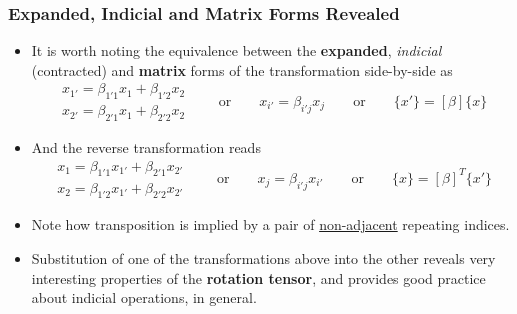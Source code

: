 \documentclass[11pt]{article}
\begin{document}
\subsubsection*{Expanded, Indicial and Matrix Forms Revealed}
\label{sec:org4f70948}
\begin{itemize}
\item It is worth noting the equivalence between the \textbf{expanded}, \emph{indicial} (contracted) and \textbf{matrix} forms of the transformation side-by-side as
$$ \begin{array}{c} x_{1'} = \beta_{1'1} x_1 + \beta_{1'2} x_2 \\ x_{2'} = \beta_{2'1} x_1 + \beta_{2'2} x_2 \end{array} \hspace{2em} \mathrm{or} \hspace{2em} x_{i'} = \beta_{i'j} x_j \hspace{2em} \mathrm{or} \hspace{2em} \{x'\} = [\beta] \{x\} $$
\end{itemize}
\begin{itemize}
\item And the reverse transformation reads 
$$ \begin{array}{c} x_1 = \beta_{1'1} x_{1'} + \beta_{2'1} x_{2'} \\ x_2 = \beta_{1'2} x_{1'} + \beta_{2'2} x_{2'} \end{array} \hspace{2em} \mathrm{or} \hspace{2em} x_j = \beta_{i'j} x_{i'}  \hspace{2em} \mathrm{or} \hspace{2em} \{x\} = [\beta]^T \{x'\}$$
\item Note how transposition is implied by a pair of \uline{non-adjacent} repeating indices.
\item Substitution of one of the transformations above into the other reveals very interesting properties of the \textbf{rotation tensor}, and provides good practice about indicial operations, in general.
\end{itemize}
\end{document}
